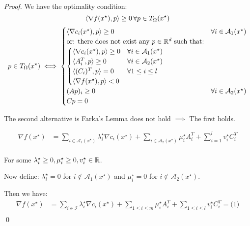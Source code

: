 \begin{proof}{}{}
  We have the optimality condition:
  \[
    \langle\nabla f(x^\star), p\rangle \geq 0 \, \forall p \in T_{\Omega}(x^\star)
  \]
  \medskip
  \begin{align*}
    p \in T_{\Omega}(x^\star) \iff
    \begin{cases}
      \langle\nabla c_i (x^\star), p \rangle\geq 0 & \forall i \in \mathcal{A}_1(x^\star)                         \\
      \text{or: there does not exist any } p \in \mathbb{R}^d \text{ such that:} & \\
      \begin{cases}
        \langle\nabla c_i (x^\star), p \rangle\geq 0 & \forall i \in \mathcal{A}_1(x^\star) \\
        \langle A_i^T , p \rangle\geq 0               & \forall i \in \mathcal{A}_2(x^\star) \\
        \langle (C_i )^T, p \rangle = 0              & \forall 1 \leq i \leq l              \\
        \langle\nabla f (x^\star), p \rangle < 0     & 
      \end{cases}                             \\
      (Ap)_i \geq 0 & \forall i \in \mathcal{A}_2(x^\star)                                                      \\
      Cp = 0        &
    \end{cases}
  \end{align*}

  The second alternative is Farka's Lemma does not hold \(\implies\) The first holds.

  \begin{align*}
    \nabla f(x^\star) & = \sum_{i\in \mathcal{A}_1(x^\star)} \lambda_i^\star \nabla c_i(x^\star) + \sum_{i \in \mathcal{A}_2(x^\star)} \mu_i^\star A_i^T + \sum_{i=1}^l v_i^\star C_i^T \\
  \end{align*}

  For some  \(\lambda_i^\star \geq 0, \mu_i^\star \geq 0, v_i^\star \in \mathbb{R}\).

  Now define: \(\lambda_i^\star = 0 \) for \(i \notin \mathcal{A}_1(x^\star)\) and \(\mu_i^\star = 0\) for \(i \notin \mathcal{A}_2(x^\star)\).

  Then we have:
  \begin{align*}
    \nabla f(x^\star) & = \sum_{i\in \mathcal{I}} \lambda_i^\star \nabla c_i(x^\star) + \sum_{1 \leq i \leq m} \mu_i^\star A_i^T + \sum_{1 \leq i \leq l} v_i^\star C_i^T = \text{(1)} \\
  \end{align*}
  \qed
\end{proof}


